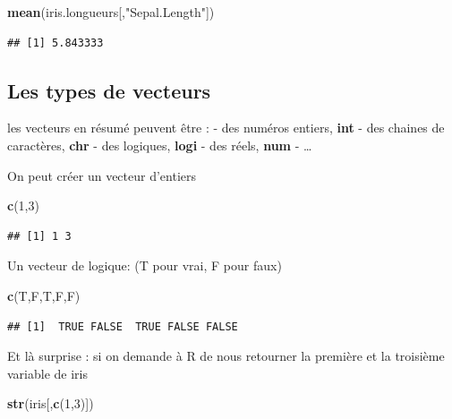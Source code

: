 \documentclass[
]{book}
\newenvironment{Shaded}{\begin{snugshade}}{\end{snugshade}}
\newcommand{\DecValTok}[1]{\textcolor[rgb]{0.00,0.00,0.81}{#1}}
\newcommand{\FunctionTok}[1]{\textcolor[rgb]{0.13,0.29,0.53}{\textbf{#1}}}
\newcommand{\NormalTok}[1]{#1}
\newcommand{\StringTok}[1]{\textcolor[rgb]{0.31,0.60,0.02}{#1}}
\begin{document}
\begin{Shaded}
\begin{Highlighting}[]
\FunctionTok{mean}\NormalTok{(iris.longueurs[,}\StringTok{"Sepal.Length"}\NormalTok{])}
\end{Highlighting}
\end{Shaded}

\begin{verbatim}
## [1] 5.843333
\end{verbatim}

\hypertarget{les-types-de-vecteurs}{%
\subsection{Les types de vecteurs}\label{les-types-de-vecteurs}}

les vecteurs en résumé peuvent être :
- des numéros entiers, \textbf{int}
- des chaines de caractères, \textbf{chr}
- des logiques, \textbf{logi}
- des réels, \textbf{num}
- \ldots{}

On peut créer un vecteur d'entiers

\begin{Shaded}
\begin{Highlighting}[]
\FunctionTok{c}\NormalTok{(}\DecValTok{1}\NormalTok{,}\DecValTok{3}\NormalTok{)}
\end{Highlighting}
\end{Shaded}

\begin{verbatim}
## [1] 1 3
\end{verbatim}

Un vecteur de logique: (T pour vrai, F pour faux)

\begin{Shaded}
\begin{Highlighting}[]
\FunctionTok{c}\NormalTok{(T,F,T,F,F)}
\end{Highlighting}
\end{Shaded}

\begin{verbatim}
## [1]  TRUE FALSE  TRUE FALSE FALSE
\end{verbatim}

Et là surprise : si on demande à R de nous retourner la première et la troisième
variable de iris

\begin{Shaded}
\begin{Highlighting}[]
\FunctionTok{str}\NormalTok{(iris[,}\FunctionTok{c}\NormalTok{(}\DecValTok{1}\NormalTok{,}\DecValTok{3}\NormalTok{)])}
\end{Highlighting}
\end{Shaded}
\end{document}
